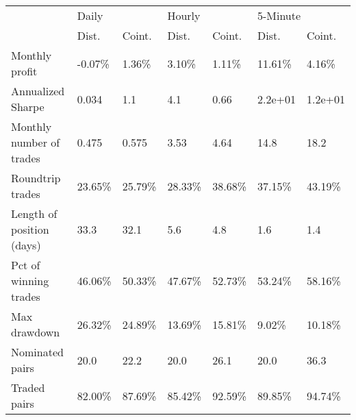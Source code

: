 \begin{tabular}{lllllll}
\toprule
{} & \multicolumn{2}{l}{Daily} & \multicolumn{2}{l}{Hourly} & \multicolumn{2}{l}{5-Minute} \\
{} &    Dist. &   Coint. &    Dist. &   Coint. &    Dist. &   Coint. \\
\midrule
Monthly profit            &  -0.07\% &   1.36\% &   3.10\% &   1.11\% &  11.61\% &   4.16\% \\
Annualized Sharpe         &    0.034 &      1.1 &      4.1 &     0.66 &  2.2e+01 &  1.2e+01 \\
Monthly number of trades  &    0.475 &    0.575 &     3.53 &     4.64 &     14.8 &     18.2 \\
Roundtrip trades          &  23.65\% &  25.79\% &  28.33\% &  38.68\% &  37.15\% &  43.19\% \\
Length of position (days) &     33.3 &     32.1 &      5.6 &      4.8 &      1.6 &      1.4 \\
Pct of winning trades     &  46.06\% &  50.33\% &  47.67\% &  52.73\% &  53.24\% &  58.16\% \\
Max drawdown              &  26.32\% &  24.89\% &  13.69\% &  15.81\% &   9.02\% &  10.18\% \\
Nominated pairs           &     20.0 &     22.2 &     20.0 &     26.1 &     20.0 &     36.3 \\
Traded pairs              &  82.00\% &  87.69\% &  85.42\% &  92.59\% &  89.85\% &  94.74\% \\
\bottomrule
\end{tabular}

